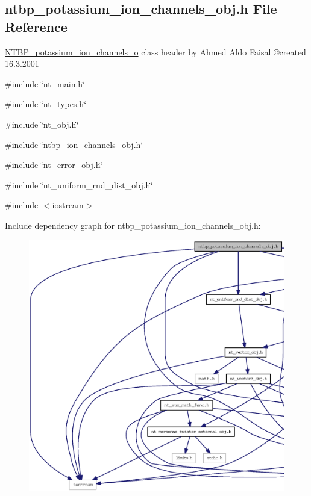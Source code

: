 \subsection{ntbp\_\-potassium\_\-ion\_\-channels\_\-obj.h File Reference}
\label{ntbp__potassium__ion__channels__obj_8h}



\begin{DoxyItemize}
\item \hyperlink{class_n_t_b_p__potassium__ion__channels__o}{NTBP\_\-potassium\_\-ion\_\-channels\_\-o} class header by Ahmed Aldo Faisal \copyright created 16.3.2001 
\end{DoxyItemize} 


{\ttfamily \#include \char`\"{}nt\_\-main.h\char`\"{}}\par
{\ttfamily \#include \char`\"{}nt\_\-types.h\char`\"{}}\par
{\ttfamily \#include \char`\"{}nt\_\-obj.h\char`\"{}}\par
{\ttfamily \#include \char`\"{}ntbp\_\-ion\_\-channels\_\-obj.h\char`\"{}}\par
{\ttfamily \#include \char`\"{}nt\_\-error\_\-obj.h\char`\"{}}\par
{\ttfamily \#include \char`\"{}nt\_\-uniform\_\-rnd\_\-dist\_\-obj.h\char`\"{}}\par
{\ttfamily \#include $<$iostream$>$}\par
Include dependency graph for ntbp\_\-potassium\_\-ion\_\-channels\_\-obj.h:
\nopagebreak
\begin{figure}[H]
\begin{center}
\leavevmode
\includegraphics[width=400pt]{ntbp__potassium__ion__channels__obj_8h__incl}
\end{center}
\end{figure}
